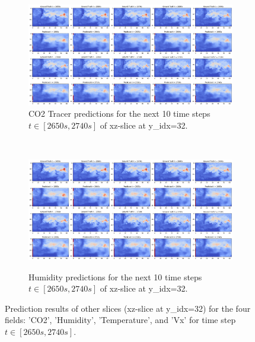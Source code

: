 \documentclass[final-report]{article-template}
\begin{document}
\clearpage

\begin{figure}[htbp]
    \renewcommand{\figurename}{Figure}
    \renewcommand{\thefigure}{B3}
    \centering
    \begin{subfigure}[t]{0.99\textwidth}
        \centering
        \includegraphics[width=\textwidth]{figures/co2_10_2650_yidx.png}
        \caption{CO2 Tracer predictions for the next 10 time steps $t \in [2650s, 2740s]$ of xz-slice at y\_idx=32.}
        \label{fig:co2_10_2650_xz}
    \end{subfigure} \\[5mm]
    \begin{subfigure}[t]{0.99\textwidth}
        \centering
        \includegraphics[width=\textwidth]{figures/humid_10_2650_yidx.png}
        \label{fig:humid_10_2650_xz}
        \caption{Humidity predictions for the next 10 time steps $t \in [2650s, 2740s]$ of xz-slice at y\_idx=32.}
    \end{subfigure}
    \caption{Prediction results of other slices (xz-slice at y\_idx=32) for the four fields: 'CO2', 'Humidity', 'Temperature', and 'Vx' for time step $t \in [2650s, 2740s]$.}
    \label{fig:other_preds_xy}
\end{figure}
\end{document}
